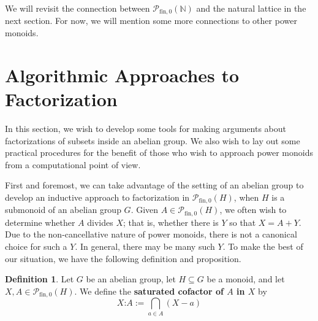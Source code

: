 \documentclass{report}
\newcommand{\NN}{\mathbb{N}}
\renewcommand{\P}{\mathcal{P}}
\newcommand{\ZZ}{\mathbb{Z}}
\newcommand{\fin}{\textrm{fin}}
\newcommand{\fon}{{\textrm{fin}, 0}}
\renewcommand{\:}{\text{:}}
\newcommand{\PN}{{\P_{\fin,0}(\NN)}}
\theoremstyle{definition}
\newtheorem{defn}{Definition}[section]
\begin{document}
We will revisit the connection between $\PN$ and the natural lattice in the next section.
For now, we will mention some more connections to other power monoids.







\section{Algorithmic Approaches to Factorization}
In this section, we wish to develop some tools for making arguments about factorizations of subsets inside an abelian group.  
We also wish to lay out some practical procedures for the benefit of those who wish to approach power monoids from a computational point of view.


First and foremost, we can take advantage of the setting of an abelian group to develop an inductive approach to factorization in $\P_\fon(H)$, when $H$ is a submonoid of an abelian group $G$.
Given $A\in \P_\fon(H)$, we often wish to determine whether $A$ divides $X$; that is, whether there is $Y$ so that $X = A+Y$.
Due to the non-cancellative nature of power monoids, there is not a canonical choice for such a $Y$.
In general, there may be many such $Y$.
To make the best of our situation, we have the following definition and proposition.

\begin{defn} \label{def:cofactor}
	Let $G$ be an abelian group, let $H \subseteq G$ be a monoid, and let $X,A\in \P_{\fin,0}(H)$.
	We define the \textbf{saturated cofactor of $A$ in $X$} by
	\[ X\:A := \bigcap_{a\in A} (X-a) \]
\end{defn}
\end{document}
